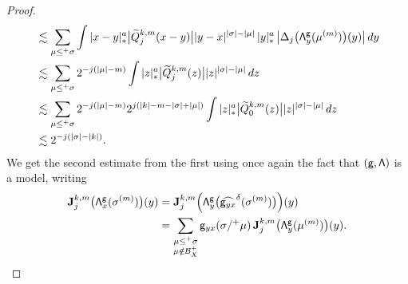 \documentclass[JEP,XML,SOM,Unicode,published]{cedram}
\theoremstyle{plain}
\theoremstyle{definition}
\newcommand{\bfJ}{\mathbf{J}}
\newcommand{\sfg}{\mathsf{g}}
\newcommand{\mcB}{\mathcal{B}}
\begin{document}
\begin{proof}
\begin{align*}
&\lesssim\sum_{\mu\le^+\sigma}\int |x-y|_*^a \big|\widetilde{Q}_j^{k,m}(x-y)\big| |y-x|^{|\sigma|-|\mu|}\,|y|_*^a\,\big|\Delta_j\bigl({\sf\Lambda}^{\sfg}_y(\mu^{(m)})\bigr)(y)\big|\,dy \\
&\lesssim\sum_{\mu\le^+\sigma}2^{-j(|\mu|-m)} \int |z|_*^a\big|\widetilde{Q}_j^{k,m}(z)\big| |z|^{|\sigma|-|\mu|}\,dz \\
&\lesssim\sum_{\mu\le^+\sigma}2^{-j(|\mu|-m)}2^{j(|k|-m-|\sigma|+|\mu|)} \int |z|_*^a\big|\widetilde{Q}_0^{k,m}(z)\big| |z|^{|\sigma|-|\mu|}\,dz \\
&\lesssim2^{-j(|\sigma|-|k|)}.
\end{align*}
We get the second estimate from the first using once again the fact that ${\sf (g,\Lambda)}$ is a model, writing
\begin{align*}
\bfJ_j^{k,m}\bigl({\sf\Lambda}^{\sfg}_x(\sigma^{(m)})\bigr)(y) &= \bfJ_j^{k,m}\Bigl({\sf\Lambda}^{\sfg}_y\bigl(\widehat{{\sf g}_{yx}}^\delta (\sigma^{(m)})\bigr)\Bigr)(y)\\
&= \sum_{\substack{\mu\le^+\sigma\\\mu\notin\mcB_X^+}}\sfg_{yx}(\sigma/^+\mu)\,\bfJ_j^{k,m}\bigl({\sf\Lambda}^{\sfg}_y(\mu^{(m)})\bigr)(y).\qedhere
\end{align*}
\end{proof}
\end{document}
